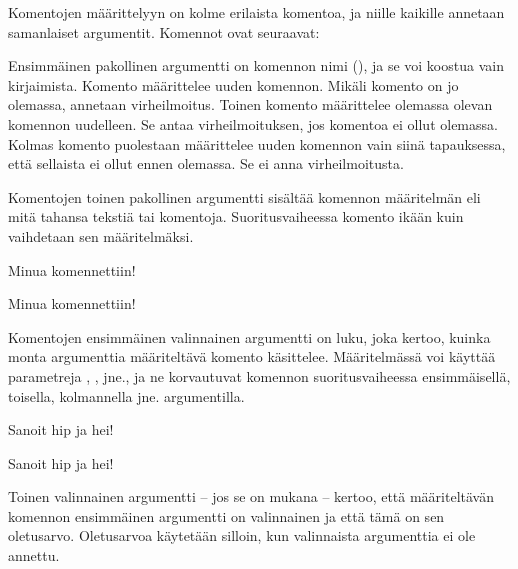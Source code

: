 Komentojen määrittelyyn on kolme erilaista komentoa, ja niille kaikille
annetaan samanlaiset argumentit. Komennot ovat seuraavat:

\begin{koodilohkosis}
\newcommand     {\nimi}[n][oletus]{määritelmä}
\renewcommand   {\nimi}[n][oletus]{määritelmä}
\providecommand {\nimi}[n][oletus]{määritelmä}
\end{koodilohkosis}

\noindent
Ensimmäinen pakollinen argumentti on komennon nimi (), ja
se voi koostua vain kirjaimista. Komento 
määrittelee uuden komennon. Mikäli komento on jo olemassa, annetaan
virheilmoitus. Toinen komento  määrittelee
olemassa olevan komennon uudelleen. Se antaa virheilmoituksen, jos
komentoa ei ollut olemassa. Kolmas komento 
puolestaan määrittelee uuden komennon vain siinä tapauksessa, että
sellaista ei ollut ennen olemassa. Se ei anna virheilmoitusta.

Komentojen toinen pakollinen argumentti  sisältää
komennon määritelmän eli mitä tahansa tekstiä tai komentoja.
Suoritusvaiheessa komento ikään kuin vaihdetaan sen määritelmäksi.

\begin{koodilohkosis}
\newcommand{\komento}{Minua komennettiin!}
\komento
\end{koodilohkosis}

\begin{tulossis}
  Minua komennettiin!
\end{tulossis}

\noindent
Komentojen ensimmäinen valinnainen argumentti  on luku, joka
kertoo, kuinka monta argumenttia määriteltävä komento käsittelee.
Määritelmässä voi käyttää parametreja , ,
 jne., ja ne korvautuvat komennon suoritusvaiheessa
ensimmäisellä, toisella, kolmannella jne. argumentilla.

\begin{koodilohkosis}
\newcommand{\komento}[2]{Sanoit #1 ja #2!}
\komento{hip}{hei}
\end{koodilohkosis}

\begin{tulossis}
  Sanoit hip ja hei!
\end{tulossis}

\noindent
Toinen valinnainen argumentti  -- jos se on mukana --
kertoo, että määriteltävän komennon ensimmäinen argumentti on
valinnainen ja että tämä on sen oletusarvo. Oletusarvoa käytetään
silloin, kun valinnaista argumenttia ei ole annettu.


